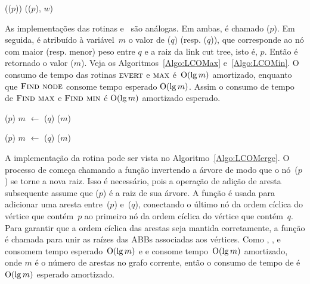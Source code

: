 \begin{algorithm}[htb]
\caption{\LCOAddCost($p$, $w$)}
\label{Algo:LCOAddCost}
\begin{algorithmic}[1]
\State \linkcutEvert(\treapLast($p$))
\State \linkcutWeight(\treapFirst($p$), $w$)
\end{algorithmic}
\end{algorithm}

As implementações das rotinas \LCOMax{} e~\LCOMin{} são análogas.
Em ambas, é chamado \linkcutEvert($p$).
Em seguida, é atribuído à variável~$m$ o valor de \linkcutMax($q$) (resp. \linkcutMin($q$)), que corresponde ao nó com maior (resp. menor) peso entre $q$ e a raiz da link cut tree, isto é, $p$.
Então é retornado o valor \LCOFindNode($m$).
Veja os Algoritmos~\ref{Algo:LCOMax} e~\ref{Algo:LCOMin}.
O consumo de tempo das rotinas $\text{\scshape \text{\scshape evert}}$ e $\text{\scshape \text{\scshape max}}$ é~$\mathrm{O}(\lg m)$ amortizado, enquanto que $\text{\scshape Find node}$ consome tempo esperado $\mathrm{O}(\lg m)$. Assim o consumo de tempo de $\text{\scshape \text{\scshape Find max}}$ e $\text{\scshape \text{\scshape Find min}}$ é $\mathrm{O}(\lg m)$ amortizado esperado.


\begin{minipage}{0.4\textwidth}
\begin{algorithm}[H]
\caption{\LCOMax($p$, $q$)}
\label{Algo:LCOMax}
\begin{algorithmic}[1]
\State \linkcutEvert($p$)
\State $m$ $\gets$ \linkcutMax($q$)
\State \Return \LCOFindNode($m$)
\end{algorithmic}
\end{algorithm}
\end{minipage}
\hfill
\begin{minipage}{0.4\textwidth}
\begin{algorithm}[H]
\caption{\LCOMin($p$, $q$)}
\label{Algo:LCOMin}
\begin{algorithmic}[1]
\State \linkcutEvert($p$)
\State $m$ $\gets$ \linkcutMin($q$)
\State \Return \LCOFindNode($m$)
\end{algorithmic}
\end{algorithm}
\end{minipage}



A implementação da rotina \LCOMerge{} pode ser vista no Algoritmo~\ref{Algo:LCOMerge}.
O processo de \LCOMerge{} começa chamando a função \linkcutEvert{} invertendo a árvore de modo que o nó~\treapLast($p$) se torne a nova raiz.
Isso é necessário, pois a operação \linkcutAddEdge{} de adição de aresta subsequente assume que \treapLast($p$) é a raiz de sua árvore.
A função \linkcutAddEdge{} é usada para adicionar uma aresta entre~\treapLast($p$) e~\treapFirst($q$), conectando o último nó da ordem cíclica do vértice que contém~$p$ ao primeiro nó da ordem cíclica do vértice que contém~$q$.
Para garantir que a ordem cíclica das arestas seja mantida corretamente, a função \treapJoin{} é chamada para unir as raízes das ABBs associadas aos vértices.
Como \treapFirst{}, \treapLast{}, \treapGetRoot{} e \treapJoin{} consomem tempo esperado~$\mathrm{O}(\lg m)$ e \linkcutEvert{} e \linkcutAddEdge{} consome tempo~$\mathrm{O}(\lg m)$ amortizado, onde $m$ é o número de arestas no grafo corrente, então o consumo de tempo de \LCOMerge{} é~$\mathrm{O}(\lg m)$ esperado amortizado.


